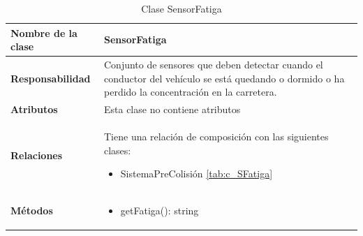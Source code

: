 \begin{table}[h]
\begin{center}
\begin{tabular}{p{} p{11cm}}
\textbf{Nombre de la clase} &  SensorFatiga\\ \hline \hline
\textbf{Responsabilidad} &  Conjunto de sensores que deben detectar cuando el conductor del vehículo se está quedando o dormido o ha perdido la concentración en la carretera.  \\ \hline
\textbf{Atributos} & Esta clase no contiene atributos\\ \hline
\textbf{Relaciones} & \par Tiene una relación de composición con las siguientes clases:
                      \begin{itemize}
                        \item SistemaPreColisión \ref{tab:c_SFatiga}
                      \end{itemize}

                      \\ \hline

\textbf{Métodos} &  \begin{itemize}
                      \item getFatiga(): string
                    \end{itemize}\\ \hline
\end{tabular}
\caption{Clase SensorFatiga}
\label{tab:c_SensorF}
\end{center}
\end{table}









